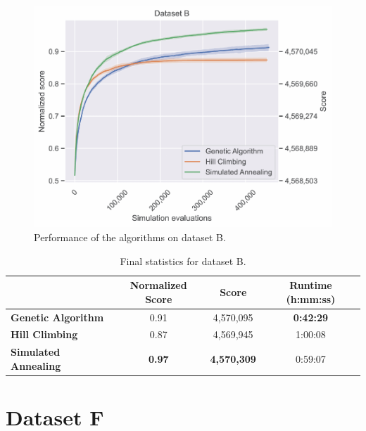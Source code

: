 \begin{figure}[h]
    \centering
    \includegraphics[width=\linewidth]{img/experiments/pdfa-b_Genetic Algorithm_Hill Climbing_Simulated Annealing.pdf}
    \caption[Performance of the algorithms on dataset B]{
        Performance of the algorithms on dataset B.
    }
    \label{fig:dataset_b_experiment}
\end{figure}

\bigskip

\begin{table}[h]
\centering\footnotesize\sf
\begin{tabular}{lccc}
\toprule
& Normalized Score & Score & Runtime (h:mm:ss) \\
\midrule
\textcolor{myblue}{\textbf{Genetic Algorithm}} & 0.91 & 4,570,095 & \textbf{0:42:29} \\
\textcolor{myorange}{\textbf{Hill Climbing}} & 0.87 & 4,569,945 & 1:00:08 \\
\textcolor{mygreen}{\textbf{Simulated Annealing}} & \textbf{0.97} & \textbf{4,570,309} & 0:59:07 \\
\bottomrule
\end{tabular}
\caption[Statistics for dataset B]{
    Final statistics for dataset B.
}
\label{tab:dataset_b_results}
\end{table}

\newpage
\section{Dataset F} \label{sec:dataset_f}

